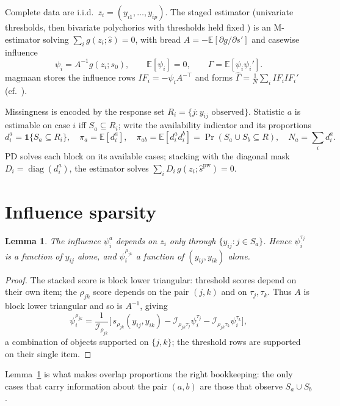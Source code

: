 \documentclass[11pt]{article}
\newcommand{\E}{\mathbb{E}}
\newcommand{\one}{\mathbf{1}}
\newcommand{\pw}{\mathrm{pw}}
\newcommand{\Ghat}{\widehat{\Gamma}}
\theoremstyle{plain}
\newtheorem{lemma}{Lemma}
\theoremstyle{remark}
\begin{document}
Complete data are i.i.d.\ $z_i=(y_{i1},\dots,y_{ip})$. The staged estimator
(univariate thresholds, then bivariate polychorics with thresholds held fixed
\cite{muthen1984,joreskog1994}) is an M-estimator solving
$\sum_i g(z_i;\hat s)=0$, with bread $A=-\E[\partial g/\partial s']$ and casewise
influence
\[
  \psi_i = A^{-1} g(z_i;s_0),
  \qquad \E[\psi_i]=0,
  \qquad \Gamma=\E[\psi_i\psi_i'] .
\]
magmaan stores the influence rows $IF_i=-\psi_i A^{-\top}$ and forms
$\Ghat=\tfrac1N\sum_i IF_i IF_i'$ (cf.\ ).

Missingness is encoded by the response set $R_i=\{j:y_{ij}\text{ observed}\}$.
Statistic $a$ is estimable on case $i$ iff $S_a\subseteq R_i$; write the
availability indicator and its proportions
\[
  d^a_i=\one\{S_a\subseteq R_i\},
  \quad
  \pi_a=\E[d^a_i],
  \quad
  \pi_{ab}=\E[d^a_i d^b_i]=\Pr(S_a\cup S_b\subseteq R),
  \quad
  N_a=\sum_i d^a_i .
\]
PD solves each block on its available cases; stacking with the diagonal mask
$D_i=\operatorname{diag}(d^a_i)$, the estimator solves
$\sum_i D_i\, g(z_i;\hat s^{\pw})=0$.

\section*{Influence sparsity}

\begin{lemma}\label{lem:sparse}
The influence $\psi^a_i$ depends on $z_i$ only through
$\{y_{ij}:j\in S_a\}$. Hence $\psi^{\tau_j}_i$ is a function of $y_{ij}$ alone,
and $\psi^{\rho_{jk}}_i$ a function of $(y_{ij},y_{ik})$ alone.
\end{lemma}

\begin{proof}
The stacked score is block lower triangular: threshold scores depend on their
own item; the $\rho_{jk}$ score depends on the pair $(j,k)$ and on
$\tau_j,\tau_k$. Thus $A$ is block lower triangular and so is $A^{-1}$, giving
\[
  \psi^{\rho_{jk}}_i
  = \frac{1}{\mathcal I_{\rho_{jk}}}
    \Big[\, s_{\rho_{jk}}(y_{ij},y_{ik})
      - \mathcal I_{\rho_{jk}\tau_j}\psi^{\tau_j}_i
      - \mathcal I_{\rho_{jk}\tau_k}\psi^{\tau_k}_i \Big],
\]
a combination of objects supported on $\{j,k\}$; the threshold rows are
supported on their single item.
\end{proof}

Lemma~\ref{lem:sparse} is what makes overlap proportions the right bookkeeping:
the only cases that carry information about the pair $(a,b)$ are those that
observe $S_a\cup S_b$.
\end{document}
